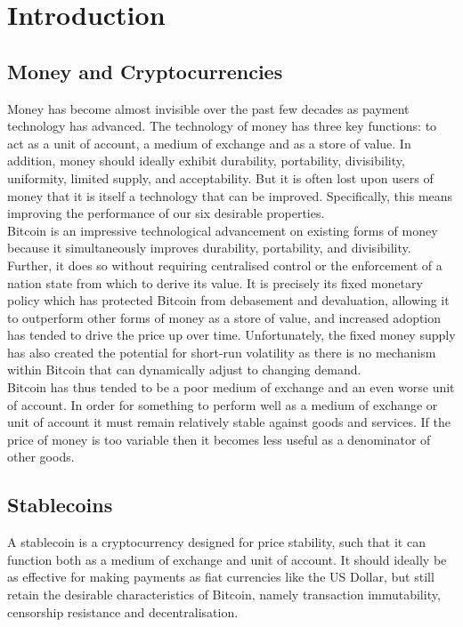 \section{Introduction}

\subsection{Money and Cryptocurrencies}

Money has become almost invisible over the past few decades as payment technology has advanced. The technology of money has three key functions: to act as a unit of account, a medium of exchange
and as a store of value. In addition, money should ideally exhibit durability, portability, divisibility, uniformity, limited supply, and acceptability. But it is often lost upon users of money that it is itself a technology that can be improved. Specifically, this means improving the performance of our six desirable properties. \\

\noindent Bitcoin is an impressive technological advancement on existing forms of money because it
simultaneously improves durability, portability, and divisibility.
Further, it does so without requiring centralised control or the enforcement of a nation state from which to derive its value. It is precisely its fixed monetary policy which has protected Bitcoin from debasement and
devaluation, allowing it to outperform other forms of money as a store of value, and increased adoption
has tended to drive the price up over time. Unfortunately, the fixed money supply has also created the
potential for short-run volatility as there is no mechanism within Bitcoin that can dynamically
adjust to changing demand. \\

\noindent Bitcoin has thus tended to be a poor medium of exchange and an even worse unit of account.
In order for something to perform well as a medium of exchange or unit of account it must remain
relatively stable against goods and services. If the price of money is too variable then it becomes less useful as a
denominator of other goods.

\subsection{Stablecoins}

\noindent A stablecoin is a cryptocurrency designed for price stability, such that it can function both as a medium of exchange and unit of account. It should ideally be as effective for making payments
as fiat currencies like the US Dollar, but still retain the desirable characteristics of Bitcoin, namely
transaction immutability, censorship resistance and decentralisation. \\

